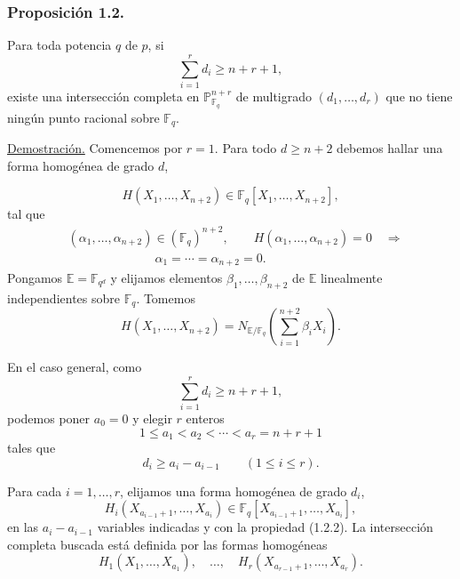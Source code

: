 \subsubsection*{Proposición 1.2.}
Para toda potencia $q$ de $p$, si
\begin{equation*}
\sum_{i=1}^{r}d_i\geq n+r+1,
\end{equation*}
existe una intersección completa en $\mathbb P^{n+r}_{\mathbb F_q}$ de
multigrado $(d_1,\dots,d_r)$ que no tiene ningún punto racional sobre
$\mathbb F_q$.

\noindent\underline{Demostración.}
Comencemos por $r=1$. Para todo $d\geq n+2$ debemos hallar una forma
homogénea de grado $d$,

\pageoriginale

\begin{equation}\tag{1.2.1}
H(X_1,\dots,X_{n+2})\in
\mathbb F_q[X_1,\dots,X_{n+2}],
\end{equation}
tal que
\begin{equation}\tag{1.2.2}
\begin{aligned}
&(\alpha_1,\dots,\alpha_{n+2})\in(\mathbb F_q)^{n+2},\qquad
H(\alpha_1,\dots,\alpha_{n+2})=0\quad\Longrightarrow\\
&\hspace{7em}\alpha_1=\cdots=\alpha_{n+2}=0.
\end{aligned}
\end{equation}
Pongamos $\mathbb E=\mathbb F_{q^d}$ y elijamos elementos
$\beta_1,\dots,\beta_{n+2}$ de $\mathbb E$ linealmente independientes
sobre $\mathbb F_q$. Tomemos
\begin{equation}\tag{1.2.3}
H(X_1,\dots,X_{n+2})=
N_{\mathbb E/\mathbb F_q}
\left(\sum_{i=1}^{n+2}\beta_iX_i\right).
\end{equation}

En el caso general, como
\begin{equation}\tag{1.2.4}
\sum_{i=1}^{r}d_i\geq n+r+1,
\end{equation}
podemos poner $a_0=0$ y elegir $r$ enteros
\begin{equation}\tag{1.2.5}
1\leq a_1<a_2<\cdots<a_r=n+r+1
\end{equation}
tales que
\begin{equation}\tag{1.2.6}
d_i\geq a_i-a_{i-1}\qquad(1\leq i\leq r).
\end{equation}

\pageoriginale

Para cada $i=1,\dots,r$, elijamos una forma homogénea de grado $d_i$,
\begin{equation*}
H_i(X_{a_{i-1}+1},\dots,X_{a_i})
\in\mathbb F_q[X_{a_{i-1}+1},\dots,X_{a_i}],
\end{equation*}
en las $a_i-a_{i-1}$ variables indicadas y con la propiedad (1.2.2). La
intersección completa buscada está definida por las formas homogéneas
\begin{equation*}
H_1(X_1,\dots,X_{a_1}),\quad\dots,\quad
H_r(X_{a_{r-1}+1},\dots,X_{a_r}).
\end{equation*}

